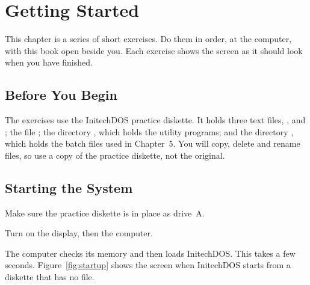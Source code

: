 \chapter{Getting Started}

This chapter is a series of short exercises.  Do them in order, at the
computer, with this book open beside you.  Each exercise shows the screen
as it should look when you have finished.

\section{Before You Begin}
The exercises use the InitechDOS practice diskette.  It holds three text
files, ,  and ; the file
; the directory , which holds the utility
programs; and the directory , which holds the batch files used
in Chapter~5.  You will copy, delete and rename files, so use a copy of the
practice diskette, not the original.

\section{Starting the System}
\begin{Steps}
\item Make sure the practice diskette is in place as drive~A.
\item Turn on the display, then the computer.
\end{Steps}
The computer checks its memory and then loads InitechDOS.  This takes a few
seconds.  Figure~\ref{fig:startup} shows the screen when InitechDOS starts
from a diskette that has no  file.

